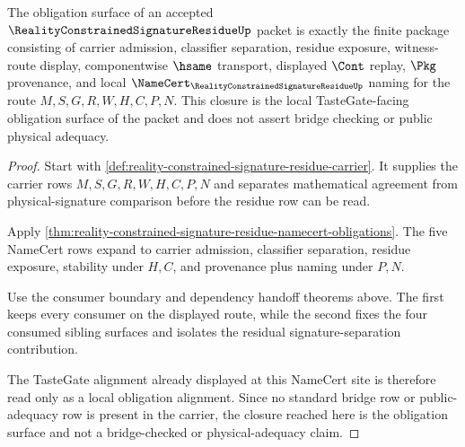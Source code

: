 \begin{theorem}
\label{thm:reality-constrained-signature-residue-obligation-closure}
The obligation surface of an accepted $\RealityConstrainedSignatureResidueUp$ packet is exactly the finite package consisting of carrier admission, classifier separation, residue exposure, witness-route display, componentwise $\hsame$ transport, displayed $\Cont$ replay, $\Pkg$ provenance, and local $\NameCert_{\RealityConstrainedSignatureResidueUp}$ naming for the route $M,S,G,R,W,H,C,P,N$. This closure is the local TasteGate-facing obligation surface of the packet and does not assert bridge checking or public physical adequacy.
\end{theorem}
\begin{proof}
Start with \autoref{def:reality-constrained-signature-residue-carrier}. It supplies the carrier rows $M,S,G,R,W,H,C,P,N$ and separates mathematical agreement from physical-signature comparison before the residue row can be read.

Apply \autoref{thm:reality-constrained-signature-residue-namecert-obligations}. The five NameCert rows expand to carrier admission, classifier separation, residue exposure, stability under $H,C$, and provenance plus naming under $P,N$.

Use the consumer boundary and dependency handoff theorems above. The first keeps every consumer on the displayed route, while the second fixes the four consumed sibling surfaces and isolates the residual signature-separation contribution.

The TasteGate alignment already displayed at this NameCert site is therefore read only as a local obligation alignment. Since no standard bridge row or public-adequacy row is present in the carrier, the closure reached here is the obligation surface and not a bridge-checked or physical-adequacy claim.
\end{proof}

